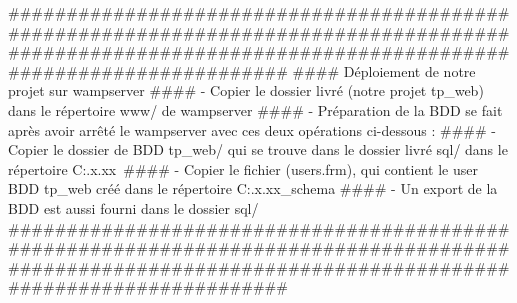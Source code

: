 #########################################################################################################################################################
####  Déploiement de notre projet sur wampserver
####  - Copier le dossier livré (notre projet tp_web) dans le répertoire www/ de wampserver
####  - Préparation de la BDD se fait après avoir arrêté le wampserver avec ces deux opérations ci-dessous :
####     - Copier le dossier de BDD tp_web/ qui se trouve dans le dossier livré sql/ dans le répertoire C:\wamp\bin\mysql\mysqlx.x.xx\data\
####     - Copier le fichier (users.frm), qui contient le user BDD tp_web créé dans le répertoire  C:\wamp\bin\mysql\mysqlx.x.xx\data\performance_schema
####  - Un export de la BDD est aussi fourni dans le dossier sql/
#########################################################################################################################################################
